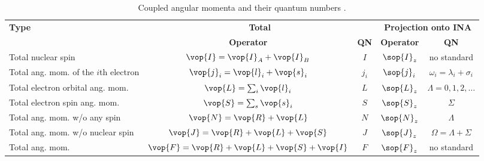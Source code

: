 \begin{table}[H]
    \centering
    \caption{Coupled angular momenta and their quantum numbers \cite[72]{lefebvre-brionSpectraDynamicsDiatomic2004}.}
    \begin{tabular}{lcccc}
        \toprule
        \multirow{2}{*}{\textbf{Type}}        & \multicolumn{2}{c}{\textbf{Total}}                & \multicolumn{2}{c}{\textbf{Projection onto INA}}                                                         \\
        \cmidrule(lr){2-3} \cmidrule(lr){4-5}
        & \textbf{Operator}                                 & \textbf{QN}                             & \textbf{Operator} & \textbf{QN}                       \\
        \midrule
        Total nuclear spin                    & $\vop{I} = \vop{I}_A + \vop{I}_B$                 & $I$                                     & $\sop{I}_z$       & no standard                       \\
        Total ang. mom. of the $i$th electron & $\vop{j}_i = \vop{l}_i + \vop{s}_i$               & $j_i$                                   & $\sop{j}_i$       & $\omega_i = \lambda_i + \sigma_i$ \\
        Total electron orbital ang. mom.      & $\vop{L} = \sum_i\vop{l}_i$                       & $L$                                     & $\sop{L}_z$       & $\Lambda = 0, 1, 2, \dots$        \\
        Total electron spin ang. mom.         & $\vop{S} = \sum_s\vop{s}_i$                       & $S$                                     & $\sop{S}_z$       & $\Sigma$                          \\
        Total ang. mom. w/o any spin          & $\vop{N} = \vop{R} + \vop{L}$                     & $N$                                     & $\sop{N}_z$       & $\Lambda$                         \\
        Total ang. mom. w/o nuclear spin      & $\vop{J} = \vop{R} + \vop{L} + \vop{S}$           & $J$                                     & $\sop{J}_z$       & $\Omega = \Lambda + \Sigma$       \\
        Total ang. mom.                       & $\vop{F} = \vop{R} + \vop{L} + \vop{S} + \vop{I}$ & $F$                                     & $\sop{F}_z$       & no standard                       \\
        \bottomrule
    \end{tabular}
\end{table}


